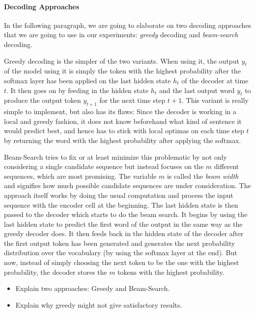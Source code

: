 \paragraph{Decoding Approaches} In the following paragraph, we are going to elaborate on two decoding approaches that we are going to use in our experiments: \emph{greedy} decoding and \emph{beam-search} decoding.

Greedy decoding is the simpler of the two variants. When using it, the output $y_t$ of the model using it is simply the token with the highest probability after the softmax layer has been applied on the last hidden state $h_t$ of the decoder at time $t$. It then goes on by feeding in the hidden state $h_t$ and the last output word $y_t$ to produce the output token $y_{t+1}$ for the next time step $t+1$. This variant is really simple to implement, but also has its flaws: Since the decoder is working in a local and greedy fashion, it does not know beforehand what kind of sentence it would predict best, and hence has to stick with local optimas on each time step $t$ by returning the word with the highest probability after applying the softmax.

Beam-Search tries to fix or at least minimize this problematic by not only considering a single candidate sequence but instead focuses on the $m$ different sequences, which are most promising. The variable $m$ is called the \emph{beam width} and signifies how much possible candidate sequences are under consideration. The approach itself works by doing the usual computation and process the input sequence with the encoder cell at the beginning. The last hidden state is then passed to the decoder which starts to do the beam search. It begins by using the last hidden state to predict the first word of the output in the same way as the greedy decoder does. It then feeds back in the hidden state of the decoder after the first output token has been generated and generates the next probability distribution over the vocabulary (by using the softmax layer at the end). But now, instead of simply choosing the next token to be the one with the highest probability, the decoder stores the $m$ tokens with the highest probability.

\begin{itemize}
	\item Explain two approaches: Greedy and Beam-Search.
	\item Explain why greedy might not give satisfactory results.
\end{itemize}

